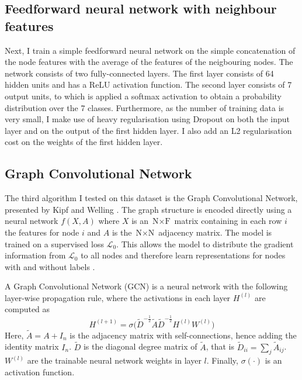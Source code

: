 \documentclass[12pt]{article}
\theoremstyle{definition}
\begin{document}
\subsection{Feedforward neural network with neighbour features}
Next, I train a simple feedforward neural network on the simple concatenation of the node features with the average of the features of the neigbouring nodes. The network consists of two fully-connected layers. The first layer consists of 64 hidden units and has a ReLU activation function. The second layer consists of 7 output units, to which is applied a softmax activation to obtain a probability distribution over the 7 classes. Furthermore, as the number of training data is very small, I make use of heavy regularisation using Dropout \cite{srivastava2014dropout} on both the input layer and on the output of the first hidden layer. I also add an L2 regularisation cost on the weights of the first hidden layer.

\subsection{Graph Convolutional Network}
The third algorithm I tested on this dataset is the Graph Convolutional Network, presented by Kipf and Welling \cite{kipf2017semi}. The graph structure is encoded directly using a neural network $f(X, A)$ where $X$ is an $\textrm{N} \times \textrm{F}$ matrix containing in each row $i$ the features for node $i$ and $A$ is the $\textrm{N} \times \textrm{N}$ adjacency matrix. The model is trained on a supervised loss $\mathcal{L}_0$. This allows the model to distribute the gradient information from $\mathcal{L}_0$ to all nodes and therefore learn representations for nodes with and without labels \cite{kipf2017semi}.

\bigskip

A Graph Convolutional Network (GCN) is a neural network with the following layer-wise propagation rule, where the activations in each layer $H^{(l)}$ are computed as
\[
H^{(l+1)} = \sigma \big( \tilde{D}^{-\frac{1}{2}} \tilde{A} \tilde{D}^{-\frac{1}{2}} H^{(l)} W^{(l)}\big)
\]
Here, $\tilde{A} = A + I_n$ is the adjacency matrix with self-connections, hence adding the identity matrix $I_n$. $\tilde{D}$ is the diagonal degree matrix of $\tilde{A}$, that is $\tilde{D}_{ii} = \sum_{j} \tilde{A}_{ij}$. $W^{(l)}$ are the trainable neural network weights in layer $l$. Finally, $\sigma(\cdot)$ is an activation function.

\bigskip
\end{document}
